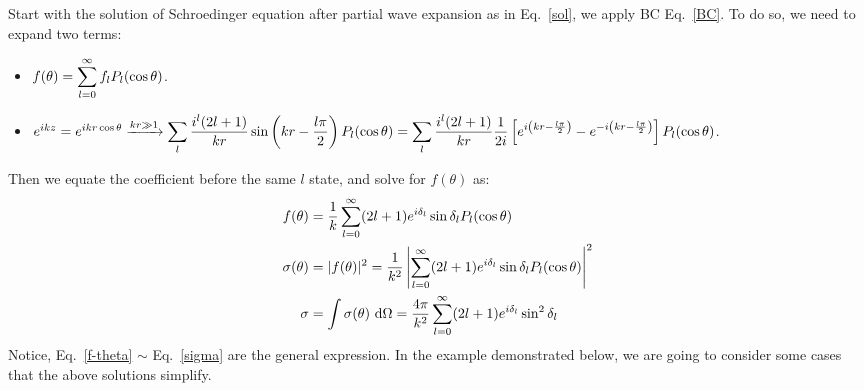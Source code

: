 \documentclass{school-22.101-notes}
\begin{document}
Start with the solution of Schroedinger equation after partial wave expansion as in Eq.~\ref{sol}, we apply BC Eq.~\ref{BC}. To do so, we need to expand two terms: 
\begin{itemize}
\item $ f(\theta) = \displaystyle\sum_{l=0}^{\infty} f_l P_l (\cos \theta)$.
\item $e^{ikz} = e^{ikr \cos \theta} \xrightarrow{kr \gg 1} \displaystyle\sum_l  \frac{i^l (2l+1)}{kr} \sin \left( kr - \frac{l \pi}{2} \right) P_l (\cos \theta) = \displaystyle\sum_l  \frac{i^l (2l+1)}{kr} \frac{1}{2i} \left[ e^{ i \left( kr - \frac{l \pi}{2} \right)} - e^{ -i \left( kr - \frac{l \pi}{2} \right)} \right] P_l (\cos \theta)$. 
\end{itemize}
Then we equate the coefficient before the same $l$ state, and solve for $f(\theta)$ as: 
\begin{align}
f(\theta) &= \frac{1}{k} \displaystyle\sum_{l=0}^{\infty} (2l+1) e^{i \delta_l} \sin \delta_l P_l (\cos \theta) \label{f-theta} \\
\sigma (\theta) &= |f(\theta)|^2 = \frac{1}{k^2} \left| \displaystyle\sum_{l=0}^{\infty} (2l+1) e^{i \delta_l} \sin \delta_l P_l (\cos \theta) \right|^2 \label{sigma-theta} \\
\sigma &= \int  \sigma(\theta) \mbox{ }\mathrm{d} \Omega= \frac{4 \pi}{k^2} \displaystyle\sum_{l=0}^{\infty} (2l+1) e^{i \delta_l} \sin^2 \delta_l  \label{sigma} 
\end{align}
Notice, Eq.~\ref{f-theta} $\sim$ Eq.~\ref{sigma} are the general expression. In the example demonstrated below, we are going to consider some cases that the above solutions simplify. 
\end{document}
